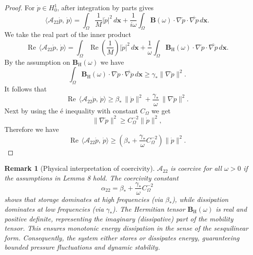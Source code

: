 \documentclass[pdflatex,sn-mathphys-num]{sn-jnl}
\theoremstyle{thmstyleone}%
\theoremstyle{thmstyletwo}%
\newtheorem{remark}{Remark}%
\theoremstyle{thmstylethree}%
\theoremstyle{definition}
\begin{document}
	\begin{proof}
		For $\dot p\in H_{0}^{1}$, after integration by parts gives
		\begin{equation*}
			\langle \mathcal{A}_{22}\dot p,\,\dot p\rangle
			= \int_\Omega \frac{1}{M}|\dot p|^2\,d\bm{x}
			+ \frac{1}{i\omega}\int_\Omega \mathbf{B}(\omega) \cdot \nabla\dot p \cdot \overline{\nabla\dot p}\,d\bm{x}. %
		\end{equation*}
		We take the real part of the inner product
		\begin{equation*}
			\operatorname{Re}\,\langle \mathcal{A}_{22}\dot p,\,\dot p\rangle
			= \int_\Omega \operatorname{Re}\left(\frac{1}{M}\right)|\dot p|^2\,d\bm{x}
			+ \frac{1}{\omega}\int_\Omega \mathbf{B}_\mathrm{H}(\omega) \cdot \nabla\dot p \cdot \overline{\nabla\dot p}\,d\bm{x}. %
		\end{equation*}
		By the assumption on $\mathbf{B}_\mathrm{H}(\omega)$ we have 
		\begin{equation*}
			\int_\Omega \mathbf{B}_\mathrm{H}(\omega) \cdot \nabla\dot p \cdot \overline{\nabla\dot p}\,d\bm{x}
			\ge \gamma_* \|\nabla\dot p\|^2. %
		\end{equation*}
		It follows that
		\begin{equation*}
			\operatorname{Re}\,\langle \mathcal{A}_{22}\dot p,\,\dot p\rangle
			\ge \beta_*\,\|\dot p\|^2
			+ \frac{\gamma_*}{\omega}\,\|\nabla\dot p\|^2. %
		\end{equation*}
		Next by using the \'e inequality with constant $C_{\Omega}$ we get
		\begin{equation*}
			\|\nabla\dot p\|^2 \ge C_{\Omega}^{-2}\|\dot p\|^2, %
		\end{equation*}
		Therefore we have
		\begin{equation*}
			\operatorname{Re}\,\langle \mathcal{A}_{22}\dot p,\,\dot p\rangle
			\ge \left(\beta_*+\frac{\gamma_*}{\omega}C_{\Omega}^{-2}\right)\|\dot p\|^2. %
		\end{equation*}
	\end{proof}
	
	\begin{remark}[Physical interpretation of coercivity]
		$\mathcal{A}_{22}$ is coercive for all $\omega > 0$ if the assumptions in Lemma 8 hold. The coercivity constant
		\[
		\alpha_{22} = \beta_* + \frac{\gamma_*}{\omega} C_{\Omega}^{-2}
		\]
		shows that storage dominates at high frequencies (via $\beta_*$), while dissipation dominates at low frequencies (via $\gamma_*$). The Hermitian tensor $\mathbf{B}_\mathrm{H}(\omega)$ is real and positive definite, representing the imaginary (dissipative) part of the mobility tensor. This ensures monotonic energy dissipation in the sense of the sesquilinear form. Consequently, the system either stores or dissipates energy, guaranteeing bounded pressure fluctuations and dynamic stability.
	\end{remark}
	
\end{document}
